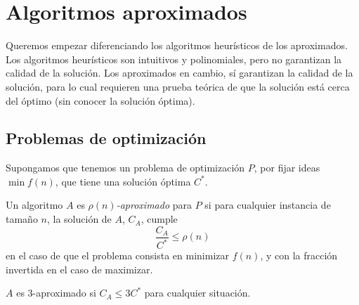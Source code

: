 \documentclass[AL.tex]{subfiles}
\begin{document}
\chapter{Algoritmos aproximados}
Queremos empezar diferenciando los algoritmos heurísticos de los aproximados. Los algoritmos heurísticos son intuitivos y polinomiales, pero no garantizan la calidad de la solución. Los aproximados en cambio, sí garantizan la calidad de la solución, para lo cual requieren una prueba teórica de que la solución está cerca del óptimo (sin conocer la solución óptima). 

\section{Problemas de optimización}

Supongamos que tenemos un problema de optimización $P$, por fijar ideas $\min f(n)$, que tiene una solución óptima $C^*$. 

\begin{defi}
Un algoritmo $A$ es \emph{$\rho(n)$-aproximado} para $P$ si para cualquier instancia de tamaño $n$, la solución de $A$, $C_A$, cumple
\[
\frac{C_A}{C^*}\leq \rho(n)
\]
en el caso de que el problema consista en minimizar $f(n)$, y con la fracción invertida en el caso de maximizar. 
\end{defi}

\begin{ej}
$A$ es 3-aproximado si $C_A\leq 3C^*$ para cualquier situación. 
\end{ej}
\end{document}
